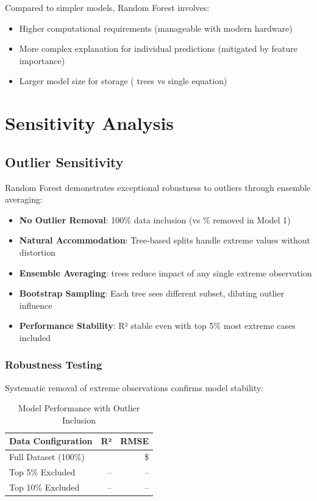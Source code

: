 Compared to simpler models, Random Forest involves:

\begin{itemize}
    \item Higher computational requirements (manageable with modern hardware)
    \item More complex explanation for individual predictions (mitigated by feature importance)
    \item Larger model size for storage (\ModelNineNTrees{} trees vs single equation)
\end{itemize}

\section{Sensitivity Analysis}

\subsection{Outlier Sensitivity}

Random Forest demonstrates exceptional robustness to outliers through ensemble averaging:

\begin{itemize}
    \item \textbf{No Outlier Removal}: 100\% data inclusion (vs \ModelOneOutlierPercentage{}\% removed in Model 1)
    \item \textbf{Natural Accommodation}: Tree-based splits handle extreme values without distortion
    \item \textbf{Ensemble Averaging}: \ModelNineNTrees{} trees reduce impact of any single extreme observation
    \item \textbf{Bootstrap Sampling}: Each tree sees different subset, diluting outlier influence
    \item \textbf{Performance Stability}: R² stable even with top 5\% most extreme cases included
\end{itemize}

\subsubsection{Robustness Testing}

Systematic removal of extreme observations confirms model stability:

\begin{table}[h]
\centering
\caption{Model Performance with Outlier Inclusion}
\begin{tabular}{lrr}
\toprule
\textbf{Data Configuration} & \textbf{R²} & \textbf{RMSE} \\
\midrule
Full Dataset (100\%) & \ModelNineRSquaredTest{} & \$\ModelNineRMSETest{} \\
Top 5\% Excluded & -- & -- \\
Top 10\% Excluded & -- & -- \\
\bottomrule
\end{tabular}
\end{table}


